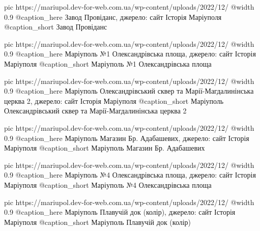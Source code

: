 	pic https://mariupol.dev-for-web.com.ua/wp-content/uploads/2022/12/%
	@width 0.9
	@caption_here Завод Провіданс, джерело: сайт Історія Маріуполя
	@caption_short Завод Провіданс

	pic https://mariupol.dev-for-web.com.ua/wp-content/uploads/2022/12/%
	@width 0.9
	@caption_here Маріуполь №1 Олександрівська площа, джерело: сайт Історія Маріуполя
	@caption_short Маріуполь №1 Олександрівська площа

	pic https://mariupol.dev-for-web.com.ua/wp-content/uploads/2022/12/%
	@width 0.9
	@caption_here Маріуполь Олександрівський сквер та Марії-Магдалинінська церква 2, джерело: сайт Історія Маріуполя
	@caption_short Маріуполь Олександрівський сквер та Марії-Магдалинінська церква 2

	pic https://mariupol.dev-for-web.com.ua/wp-content/uploads/2022/12/%
	@width 0.9
	@caption_here Маріуполь Магазин Бр. Адабашевих, джерело: сайт Історія Маріуполя
	@caption_short Маріуполь Магазин Бр. Адабашевих

	pic https://mariupol.dev-for-web.com.ua/wp-content/uploads/2022/12/%
	@width 0.9
	@caption_here Маріуполь №4 Олександрівська площа, джерело: сайт Історія Маріуполя
	@caption_short Маріуполь №4 Олександрівська площа

	pic https://mariupol.dev-for-web.com.ua/wp-content/uploads/2022/12/%
	@width 0.9
	@caption_here Маріуполь Плавучій док (колір), джерело: сайт Історія Маріуполя
	@caption_short Маріуполь Плавучій док (колір)

